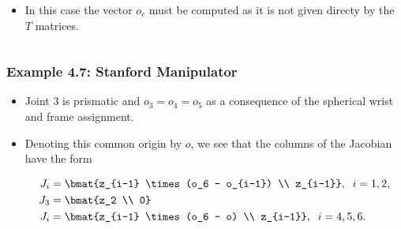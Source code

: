 \begin{frame}
\begin{columns}
\begin{column}{0.4\textwidth}
            \begin{itemize}
                \item In this case the vector $o_c$ must be computed as it is 
                not given directy by the $T$ matrices.
            \end{itemize}
        \end{column}
    \end{columns}
\end{frame}

\begin{frame}
    \frametitle{Example 4.7: Stanford Manipulator}
   
    \begin{itemize}
        \item Joint $3$ is prismatic and $o_3 = o_4 = o_5$ as a consequence of 
        the spherical wrist and frame assignment.
        \item Denoting this common origin by $o$, we see that the columns of the 
        Jacobian have the form

        \begin{align*}
            J_i &= \bmat{z_{i-1} \times (o_6 - o_{i-1}) \\ z_{i-1}}, \; \; i = 1,2, \\
            J_3 &= \bmat{z_2 \\ 0} \\
            J_i &= \bmat{z_{i-1} \times (o_6 - o) \\ z_{i-1}}, \; \; i = 4,5,6.
        \end{align*}
    \end{itemize}
\end{frame}

